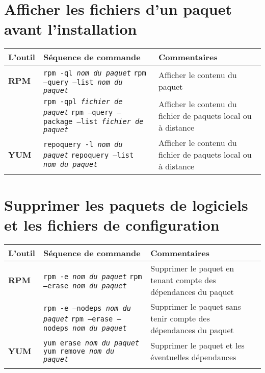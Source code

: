 \documentclass[10pt,a4paper]{article}
\newcommand{\tabellenkopf}{
  \textbf{L'outil} & \textbf{Séquence de commande} & \textbf{Commentaires} \\
}
\begin{document}
\newpage

\cheatsheet

\section{Afficher les fichiers d'un paquet avant l'installation}
\begin{tabular}{ p{3.5cm} p{9cm} p{11cm}}
  \hline
  \rowcolor{Gray}
  \tabellenkopf
  \hline 
  \textbf{RPM} & \texttt{rpm -ql \textit{nom du paquet}} \newline \texttt{rpm --query --list \textit{nom du paquet}} & Afficher le contenu du paquet\\
  \rowcolor{Gray}
  & \texttt{rpm -qpl \textit{fichier de paquet}} \newline \texttt{rpm --query --package --list \textit{fichier de paquet}} & Afficher le contenu du fichier de paquets local ou à distance\\
  \textbf{YUM} & \texttt{repoquery -l \textit{nom du paquet}} \newline \texttt{repoquery --list \textit{nom du paquet}} & Afficher le contenu du fichier de paquets local ou à distance \\
  \hline
\end{tabular}

\section{Supprimer les paquets de logiciels et les fichiers de configuration}
\begin{tabular}{ p{3.5cm} p{9cm} p{11cm}}
  \hline
  \rowcolor{Gray}
  \tabellenkopf
  \hline 
  \textbf{RPM} & \texttt{rpm -e \textit{nom du paquet}} \newline \texttt{rpm --erase \textit{nom du paquet}} & Supprimer le paquet en tenant compte des dépendances du paquet \\
  \rowcolor{Gray}
  & \texttt{rpm -e --nodeps \textit{nom du paquet}} \newline \texttt{rpm --erase  --nodeps \textit{nom du paquet}} & Supprimer le paquet sans tenir compte des dépendances du paquet \\
  \textbf{YUM} & \texttt{yum erase \textit{nom du paquet}} \newline \texttt{yum remove \textit{nom du paquet}} & Supprimer le paquet et les éventuelles dépendances \\
  \rowcolor{Gray}
  \hline
\end{tabular}
\end{document}
